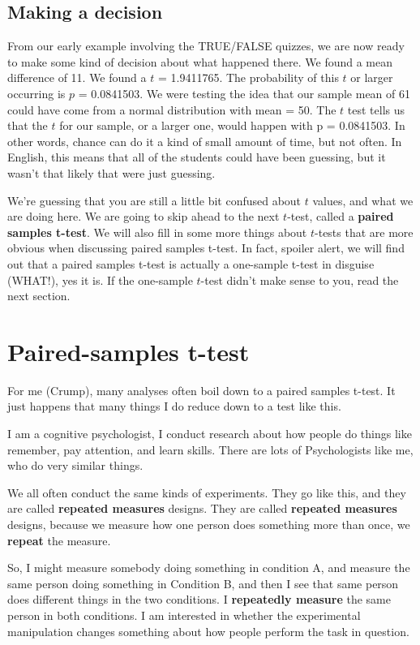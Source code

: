 \documentclass[
]{book}
\begin{document}
\subsection{Making a decision}\label{making-a-decision}

From our early example involving the TRUE/FALSE quizzes, we are now ready to make some kind of decision about what happened there. We found a mean difference of 11. We found a \(t\) = 1.9411765. The probability of this \(t\) or larger occurring is \(p\) = 0.0841503. We were testing the idea that our sample mean of 61 could have come from a normal distribution with mean = 50. The \(t\) test tells us that the \(t\) for our sample, or a larger one, would happen with p = 0.0841503. In other words, chance can do it a kind of small amount of time, but not often. In English, this means that all of the students could have been guessing, but it wasn't that likely that were just guessing.

We're guessing that you are still a little bit confused about \(t\) values, and what we are doing here. We are going to skip ahead to the next \(t\)-test, called a \textbf{paired samples t-test}. We will also fill in some more things about \(t\)-tests that are more obvious when discussing paired samples t-test. In fact, spoiler alert, we will find out that a paired samples t-test is actually a one-sample t-test in disguise (WHAT!), yes it is. If the one-sample \(t\)-test didn't make sense to you, read the next section.

\section{Paired-samples t-test}\label{paired-samples-t-test}

For me (Crump), many analyses often boil down to a paired samples t-test. It just happens that many things I do reduce down to a test like this.

I am a cognitive psychologist, I conduct research about how people do things like remember, pay attention, and learn skills. There are lots of Psychologists like me, who do very similar things.

We all often conduct the same kinds of experiments. They go like this, and they are called \textbf{repeated measures} designs. They are called \textbf{repeated measures} designs, because we measure how one person does something more than once, we \textbf{repeat} the measure.

So, I might measure somebody doing something in condition A, and measure the same person doing something in Condition B, and then I see that same person does different things in the two conditions. I \textbf{repeatedly measure} the same person in both conditions. I am interested in whether the experimental manipulation changes something about how people perform the task in question.
\end{document}
